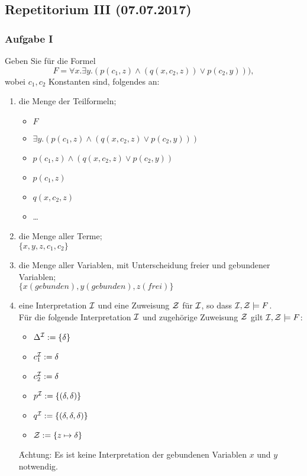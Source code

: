 \newcommand{\SUBINT}{\mathcal{J}}
\subsection*{Repetitorium III (07.07.2017)}
\subsubsection*{Aufgabe I}
Geben Sie für die Formel
\begin{equation*}
F = \forall x.\exists y.(p(c_1,z) \land (q(x,c_2,z)) \lor p(c_2,y))),
\end{equation*}
wobei $c_1,c_2$ Konstanten sind, folgendes an:
\begin{enumerate}
	\item die Menge der Teilformeln; \\
	\LOES 
	\begin{itemize}
	\item $F$
	\item $\exists y.(p(c_1,z) \land (q(x, c_2, z) \lor p(c_2,y)))$
	\item $p(c_1,z) \land (q(x,c_2,z) \lor p(c_2, y))$
	\item $p(c_1, z)$
	\item $q(x,c_2,z)$
	\item \dots
	\end{itemize}
	\item die Menge aller Terme; \\
	\LOES $\{ x, y, z, c_1, c_2 \}$
	\item die Menge aller Variablen, mit Unterscheidung freier und gebundener Variablen; \\
	\LOES $\{ x (gebunden), y (gebunden), z (frei) \}$
	\item eine Interpretation $\mathcal{I}$ und eine Zuweisung $\mathcal{Z}$ für $\mathcal{I}$, so dass $\mathcal{I},\mathcal{Z} \models F$. \\
\LOES Für die folgende Interpretation $\mathcal{I}$ und zugehörige Zuweisung $\mathcal{Z}$ gilt $\mathcal{I}, \mathcal{Z} \models F$:
\begin{itemize}
	\item $\Delta^{\mathcal{I}} := \{\delta \}$
	\item $c_1^{\mathcal{I}} := \delta$
	\item $c_2^{\mathcal{I}} := \delta$
	\item $p^{\mathcal{I}} := \{(\delta,\delta)\}$
	\item $q^{\mathcal{I}} := \{(\delta,\delta,\delta)\}$
	\item $\mathcal{Z} := \{ z \mapsto \delta \}$
\end{itemize}
\f{Achtung:} Es ist keine Interpretation der gebundenen Variablen $x$ und $y$ notwendig. \\


\end{enumerate}
